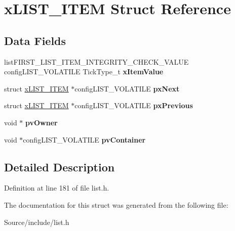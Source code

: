 \hypertarget{structx_l_i_s_t___i_t_e_m}{}\section{x\+L\+I\+S\+T\+\_\+\+I\+T\+E\+M Struct Reference}
\label{structx_l_i_s_t___i_t_e_m}
\subsection*{Data Fields}
\begin{DoxyCompactItemize}
\item 
\hypertarget{structx_l_i_s_t___i_t_e_m_aa6f3caf3e73107fb0da6fede4b06f104}{}list\+F\+I\+R\+S\+T\+\_\+\+L\+I\+S\+T\+\_\+\+I\+T\+E\+M\+\_\+\+I\+N\+T\+E\+G\+R\+I\+T\+Y\+\_\+\+C\+H\+E\+C\+K\+\_\+\+V\+A\+L\+U\+E config\+L\+I\+S\+T\+\_\+\+V\+O\+L\+A\+T\+I\+L\+E Tick\+Type\+\_\+t {\bfseries x\+Item\+Value}\label{structx_l_i_s_t___i_t_e_m_aa6f3caf3e73107fb0da6fede4b06f104}

\item 
\hypertarget{structx_l_i_s_t___i_t_e_m_a77927cd93dda0c59b3855aca58881ca1}{}struct \hyperlink{structx_l_i_s_t___i_t_e_m}{x\+L\+I\+S\+T\+\_\+\+I\+T\+E\+M} $\ast$config\+L\+I\+S\+T\+\_\+\+V\+O\+L\+A\+T\+I\+L\+E {\bfseries px\+Next}\label{structx_l_i_s_t___i_t_e_m_a77927cd93dda0c59b3855aca58881ca1}

\item 
\hypertarget{structx_l_i_s_t___i_t_e_m_a0294e93ecc18bcdb723038af1027505d}{}struct \hyperlink{structx_l_i_s_t___i_t_e_m}{x\+L\+I\+S\+T\+\_\+\+I\+T\+E\+M} $\ast$config\+L\+I\+S\+T\+\_\+\+V\+O\+L\+A\+T\+I\+L\+E {\bfseries px\+Previous}\label{structx_l_i_s_t___i_t_e_m_a0294e93ecc18bcdb723038af1027505d}

\item 
\hypertarget{structx_l_i_s_t___i_t_e_m_aeb54d184fbcccb5748e66cb2426e3b3f}{}void $\ast$ {\bfseries pv\+Owner}\label{structx_l_i_s_t___i_t_e_m_aeb54d184fbcccb5748e66cb2426e3b3f}

\item 
\hypertarget{structx_l_i_s_t___i_t_e_m_a0a7b95bc338d7d9df18e10607893d103}{}void $\ast$config\+L\+I\+S\+T\+\_\+\+V\+O\+L\+A\+T\+I\+L\+E {\bfseries pv\+Container}\label{structx_l_i_s_t___i_t_e_m_a0a7b95bc338d7d9df18e10607893d103}

\end{DoxyCompactItemize}


\subsection{Detailed Description}


Definition at line 181 of file list.\+h.



The documentation for this struct was generated from the following file\+:\begin{DoxyCompactItemize}
\item 
Source/include/list.\+h\end{DoxyCompactItemize}
